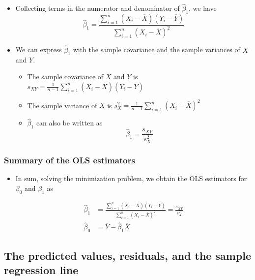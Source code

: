 \documentclass[11pt]{article}
\begin{document}
\begin{itemize}
\item Collecting terms in the numerator and denominator of
\(\hat{\beta}_1\), we have
\begin{equation*}
\hat{\beta}_1 = \frac{\sum_{i=1}^n (X_i - \overline{X})(Y_i - \overline{Y})}{\sum_{i=1}^n (X_i - \overline{X})^2}
\end{equation*}

\item We can express \(\hat{\beta}_1\) with the sample covariance and the
sample variances of \(X\) and \(Y\).
\begin{itemize}
\item The sample covariance of \(X\) and \(Y\) is \(s_{XY} =
    \frac{1}{n-1} \sum_{i=1}^n (X_i - \overline{X})(Y_i - \overline{Y})\)

\item The sample variance of \(X\) is \(s_X^2 = \frac{1}{n-1} \sum_{i=1}^n
    (X_i - \overline{X})^2\)

\item \(\hat{\beta}_1\) can also be written as
\[ \hat{\beta}_1 = \frac{s_{XY}}{s^2_X}  \]
\end{itemize}
\end{itemize}

\subsubsection*{Summary of the OLS estimators}
\label{sec:org4891322}

\begin{itemize}
\item In sum, solving the minimization problem, we obtain the OLS
estimators for \(\beta_0\) and \(\beta_1\) as

\begin{align}
\hat{\beta}_1 & = \frac{\sum_{i=1}^n (X_i - \overline{X})(Y_i - \overline{Y})}{\sum_{i=1}^n (X_i - \overline{X})^2} = \frac{s_{XY}}{s^2_X}  \label{eq:betahat-1} \\
\hat{\beta}_0 & = \overline{Y} - \hat{\beta}_1 \overline{X}  \label{eq:betahat-0}
\end{align}
\end{itemize}


\subsection*{The predicted values, residuals, and the sample regression line}
\label{sec:org0804e79}
\end{document}
